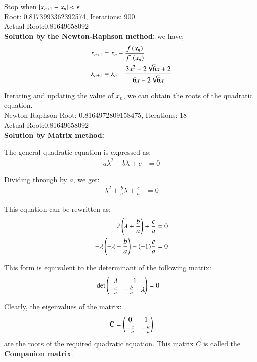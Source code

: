 \documentclass[journal,12pt,onecolumn]{IEEEtran}
\theoremstyle{remark}
\begin{document}
Stop when $\left\vert x_{n+1}-x_n\right\vert<\epsilon$\\
Root: 0.8173993362392574, Iterations: 900\\
Actual Root:0.81649658092\\


\textbf{Solution by the Newton-Raphson method:}
we have;
\begin{align}
	x_{n+1}&=x_n -\frac{f\left(x_n\right)}{f^{'}\left(x_n\right)}\\
	x_{n+1}&=x_n - \frac{3x^2 - 2\sqrt{6}x + 2}{6x - 2\sqrt{6}x}
\end{align}

Iterating and updating the value of $x_{n}$, we can obtain the roots of the quadratic equation. \\
Newton-Raphson Root: 0.8164972809158475, Iterations: 18\\
Actual Root:0.81649658092\\

\textbf{Solution by Matrix method:}

The general quadratic equation is expressed as:
\begin{align}
    a\lambda^2 + b\lambda + c &= 0
\end{align}

Dividing through by \(a\), we get:
\begin{align}
    \lambda^2 + \frac{b}{a} \lambda + \frac{c}{a} &= 0
\end{align}

This equation can be rewritten as:
\begin{align}
    \lambda \left(\lambda + \frac{b}{a}\right) + \frac{c}{a} &= 0 \\
    -\lambda \left(-\lambda - \frac{b}{a}\right) - (-1)\frac{c}{a} &= 0
\end{align}

This form is equivalent to the determinant of the following matrix:
\begin{align}
    \det\begin{pmatrix}-\lambda & 1 \\ -\frac{c}{a} & -\frac{b}{a} - \lambda\end{pmatrix} &= 0 \label{eq:matrix}
\end{align}

Clearly, the eigenvalues of the matrix:
\begin{align}
    \mathbf{C} = \begin{pmatrix}0 & 1 \\ -\frac{c}{a} & -\frac{b}{a}\end{pmatrix} \label{eq:cmat}
\end{align}
are the roots of the required quadratic equation. This matrix \(\vec{C}\) is called the \textbf{Companion matrix}.
\end{document}
